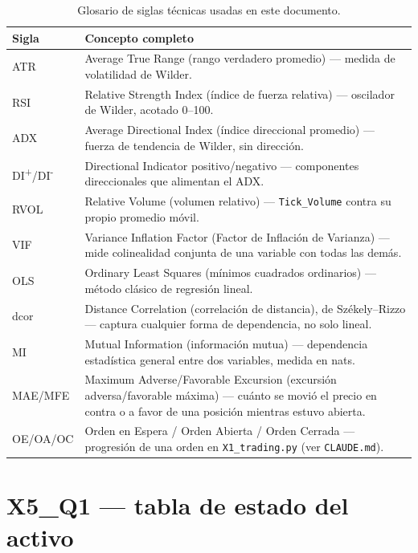\documentclass[11pt,a4paper]{article}
\newcommand{\code}[1]{\texttt{\small #1}}
\begin{document}
\begin{table}[h]
\centering
\small
\begin{tabularx}{\linewidth}{@{}l X@{}}
\toprule
\textbf{Sigla} & \textbf{Concepto completo} \\
\midrule
ATR & Average True Range (rango verdadero promedio) — medida de volatilidad de Wilder. \\
RSI & Relative Strength Index (índice de fuerza relativa) — oscilador de Wilder, acotado
  0--100. \\
ADX & Average Directional Index (índice direccional promedio) — fuerza de tendencia de
  Wilder, sin dirección. \\
DI\textsuperscript{+}/DI\textsuperscript{-} & Directional Indicator positivo/negativo —
  componentes direccionales que alimentan el ADX. \\
RVOL & Relative Volume (volumen relativo) — \code{Tick\_Volume} contra su propio promedio
  móvil. \\
VIF & Variance Inflation Factor (Factor de Inflación de Varianza) — mide colinealidad
  conjunta de una variable con todas las demás. \\
OLS & Ordinary Least Squares (mínimos cuadrados ordinarios) — método clásico de
  regresión lineal. \\
dcor & Distance Correlation (correlación de distancia), de Székely--Rizzo — captura
  cualquier forma de dependencia, no solo lineal. \\
MI & Mutual Information (información mutua) — dependencia estadística general entre dos
  variables, medida en nats. \\
MAE/MFE & Maximum Adverse/Favorable Excursion (excursión adversa/favorable máxima) — cuánto
  se movió el precio en contra o a favor de una posición mientras estuvo abierta. \\
OE/OA/OC & Orden en Espera / Orden Abierta / Orden Cerrada — progresión de una orden en
  \code{X1\_trading.py} (ver \code{CLAUDE.md}). \\
\bottomrule
\end{tabularx}
\caption{Glosario de siglas técnicas usadas en este documento.}
\end{table}

\newpage
\section{X5\_Q1 — tabla de estado del activo}
\label{sec:q1}
\end{document}
